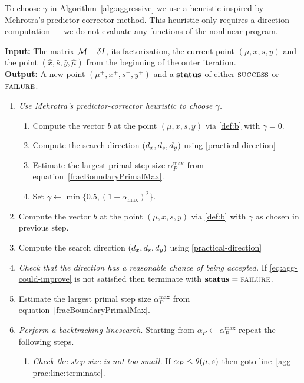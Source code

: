 \documentclass{article}
\begin{document}
To choose $\gamma$ in Algorithm~\ref{alg:aggressive} we use a heuristic inspired by Mehrotra's predictor-corrector method. This heuristic only requires a direction computation --- we do not evaluate any functions of the nonlinear program.

\begin{algorithm}[H]
\textbf{Input:} The matrix $\mathcal{M} + \delta I$, its factorization, the current point $(\mu, x, s, y)$ and the point $(\hat{x}, \hat{s},  \hat{y}, \hat{\mu})$ from the beginning of the outer iteration.  \\
\textbf{Output:} A new point $(\mu^{+}, x^{+}, s^{+}, y^{+})$ and a $\textbf{status}$ of either $\textsc{success}$ or $\textsc{failure}$.
\begin{enumerate}[label*=A.{\arabic*}]
\item \label{mehrotra-heuristic} \emph{Use Mehrotra's predictor-corrector heuristic to choose $\gamma$.} 
\begin{enumerate}[label*=.{\arabic*}]
\item Compute the vector $b$ at the point $(\mu, x, s, y)$ via \eqref{def:b} with $\gamma = 0$.
\item Compute the search direction $(d_{x}, d_{s}, d_{y})$ using \eqref{practical-direction}
\item Estimate the largest primal step size $\alpha^{\max}_{P}$ from equation~\eqref{fracBoundaryPrimalMax}.
\item Set $\gamma \gets \min\{0.5, (1 - \alpha_{\max})^2 \}$.
\end{enumerate}
\item Compute the vector $b$ at the point $(\mu, x, s, y)$ via \eqref{def:b} with $\gamma$ as chosen in previous step.
\item Compute the search direction $(d_{x}, d_{s}, d_{y})$ using \eqref{practical-direction}
\item \emph{Check that the direction has a reasonable chance of being accepted.} If \eqref{eq:agg-could-improve} is not satisfied then terminate with $\textbf{status} = \textsc{failure}$.
\item Estimate the largest primal step size $\alpha^{\max}_{P}$ from equation~\eqref{fracBoundaryPrimalMax}.
\item \label{agg:line:back-track} \emph{Perform a backtracking linesearch}. Starting from $\alpha_{P} \gets \alpha^{\max}_{P}$ repeat the following steps.
\begin{enumerate}[label*=.{\arabic*}]
\item \label{prac-agg:line:back-too-small} \emph{Check the step size is not too small.} If $\alpha_{P} \le \bar{\theta}(\mu, s)$ then goto line~\ref{agg-prac:line:terminate}.

\end{enumerate}
\end{enumerate}
\end{algorithm}
\end{document}
